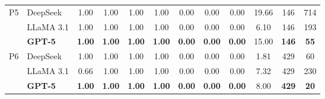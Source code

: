 \documentclass[review,12pt]{elsarticle}
\begin{document}
\begin{table}[htbp]
\begin{adjustbox}{max width=\textwidth}
\begin{tabular}{c l c c c c c c c c c c}
\midrule
P5 & DeepSeek & 1.00 & 1.00 & 1.00 & 1.00 & 0.00 & 0.00 & 0.00 & 19.66 & 146 & 714 \\[-4pt]
   & LLaMA 3.1 & 1.00 & 1.00 & 1.00 & 1.00 & 0.00 & 0.00 & 0.00 & 6.10 & 146 & 193 \\[-4pt]
   & \textbf{GPT-5} & \textbf{1.00} & \textbf{1.00} & \textbf{1.00} & \textbf{1.00} & \textbf{0.00} & \textbf{0.00} & \textbf{0.00} & 15.00 & \textbf{146} & \textbf{55} \\
\midrule
P6 & DeepSeek & 1.00 & 1.00 & 1.00 & 1.00 & 0.00 & 0.00 & 0.00 & 1.81 & 429 & 60 \\[-4pt]
   & LLaMA 3.1 & 0.66 & 1.00 & 1.00 & 1.00 & 0.00 & 0.00 & 0.00 & 7.32 & 429 & 230 \\[-4pt]
   & \textbf{GPT-5} & \textbf{1.00} & \textbf{1.00} & \textbf{1.00} & \textbf{1.00} & \textbf{0.00} & \textbf{0.00} & \textbf{0.00} & 8.00 & \textbf{429} & \textbf{20} \\
\bottomrule
\end{tabular}
\end{adjustbox}
\end{table}
\end{document}
